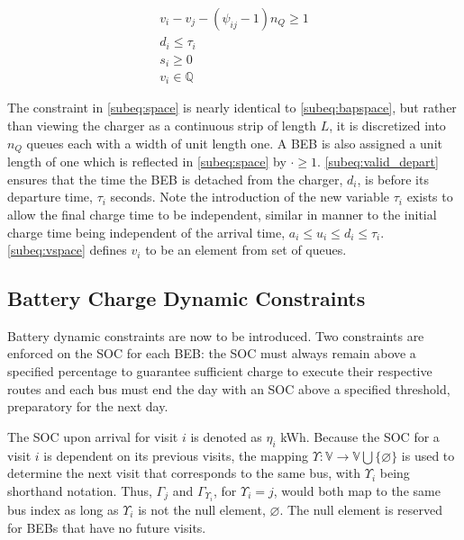 \documentclass[utf8]{FrontiersinHarvard}
\newcommand{\EDIT}[1]{{\color{blue}#1}}                                         %
\begin{document}
\begin{subequations}
\label{eq:packconstrs}
\begin{align}
    v_i - v_j - (\psi_{ij} - 1)n_Q \geq 1 \label{subeq:space} \\ d_i \leq \tau_i \label{subeq:valid_depart} \\ s_i \geq
    0 \label{subeq:pos_charge} \\ v_i \in \mathbb{Q} \label{subeq:vspace}
\end{align}
\end{subequations}

The constraint in \autoref{subeq:space} is nearly identical to \autoref{subeq:bapspace}, but rather than viewing the
charger as a continuous strip of length \(L\), it is discretized into \(n_Q\) queues each with a width of unit length one. A
BEB is also assigned a unit length of one which is reflected in \autoref{subeq:space} by \(\cdot \geq 1\).
\autoref{subeq:valid_depart} ensures that the time the BEB is detached from the charger, \(d_i\), is before its departure
time, \(\tau_i\) seconds. Note the introduction of the new variable \(\tau_i\) exists to allow the final charge time to be
independent, \EDIT{similar in manner to the initial charge time being independent of the arrival time}, \(a_i
\le u_i \le d_i \le \tau_i\). \autoref{subeq:vspace} defines \(v_i\) \EDIT{to be an element from set of queues}.

\subsection{Battery Charge Dynamic Constraints}
\label{sec:batt_dynamics}
Battery dynamic constraints are now to be introduced. Two constraints are enforced on the SOC for each BEB: the SOC must
always remain above a specified percentage to guarantee sufficient charge to execute their respective routes and each
bus must end the day with an SOC above a specified threshold, preparatory for the next day.

The SOC upon arrival for visit \(i\) is denoted as \(\eta_i\) kWh. Because the SOC for a visit \(i\) is dependent on its previous
visits, the mapping \(\Upsilon: \mathbb{V} \rightarrow \mathbb{V} \bigcup \{\varnothing\}\) is used to determine the next visit that corresponds
to the same bus, with \(\Upsilon_i\) being shorthand notation. Thus, \(\Gamma_j\) and \(\Gamma_{\Upsilon_i}\), for \(\Upsilon_i = j\), would both map to the
same bus index as long as \(\Upsilon_i\) is not the null element, \(\varnothing\). The null element is reserved for BEBs that have
no future visits.
\end{document}
